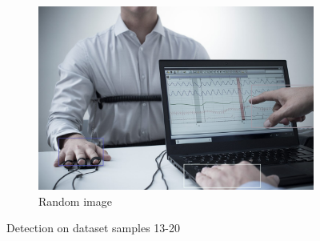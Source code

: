 \begin{figure}[!h]
\begin{subfigure}[b]{0.3\textwidth}
    \end{subfigure}
    \hfill
    \begin{subfigure}[b]{0.3\textwidth}
        \centering
        \includegraphics[width=\textwidth]{images/handDetection/test.jpg}
        \caption{Random image}
        
    \end{subfigure}
    \caption{Detection on dataset samples 13-20}
       
\end{figure}

\clearpage

